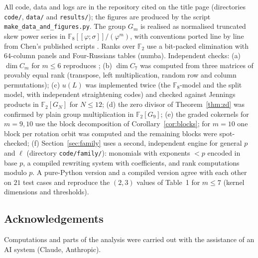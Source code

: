\documentclass[11pt]{amsart}
\theoremstyle{definition}
\newcommand{\F}{\mathbb{F}}
\begin{document}
All code, data and logs are in the repository cited on the title page (directories \texttt{code/},
\texttt{data/} and \texttt{results/}); the figures are produced by the script
\texttt{make\_data\_and\_figures.py}. The group $G_m$ is realised as normalised
truncated skew power series in $\F_8[[\varphi;\sigma]]/(\varphi^m)$, with conventions ported line by line from
Chen's published scripts \cite{ChenIII}. Ranks over $\F_2$ use a bit-packed elimination with $64$-column panels
and Four-Russians tables (numba). Independent checks:
(a) $\dim C_m$ for $m\le6$ reproduces \cite{ChenIII};
(b) $\dim C_7$ was computed from three matrices of provably equal rank (transpose, left multiplication, random
row and column permutations);
(c) $u(L)$ was implemented twice (the $\F_8$-model and the split model, with independent straightening codes) and
checked against Jennings products in $\F_2[G_N]$ for $N\le12$;
(d) the zero divisor of Theorem~\ref{thm:zd} was confirmed by plain group multiplication in $\F_2[G_9]$;
(e) the graded cokernels for $m=9,10$ use the block decomposition of Corollary~\ref{cor:blocks}; for $m=10$ one block
per rotation orbit was computed and the remaining blocks were spot-checked;
(f) Section~\ref{sec:family} uses a second, independent engine for general $p$ and $\ell$ (directory
\texttt{code/family/}): monomials with exponents $<p$ encoded in base $p$, a compiled rewriting system with coefficients,
and rank computations modulo $p$. A pure-Python version and a compiled version agree with each other on $21$ test cases
and reproduce the $(2,3)$ values of Table~1 for $m\le7$ (kernel dimensions and thresholds).

\subsection*{Acknowledgements}
Computations and parts of the analysis were carried out with the assistance of an AI system (Claude, Anthropic).
\end{document}
